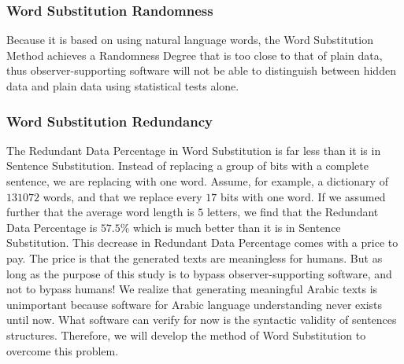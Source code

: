 \documentclass{acm_proc_article-sp}
\begin{document}
\subsubsection{Word Substitution Randomness}\label{Word-Substitution-Randomness}
Because it is based on using natural language words, the Word Substitution Method achieves a Randomness Degree that is too close to that of plain data, thus observer-supporting software will not be able to distinguish between hidden data and plain data using statistical tests alone.

\subsubsection{Word Substitution Redundancy}\label{Word-Substitution-Redundancy}
The Redundant Data Percentage in Word Substitution is far less than it is in Sentence Substitution. Instead of replacing a group of bits with a complete sentence, we are replacing with one word. Assume, for example, a dictionary of $131072$ words, and that we replace every $17$ bits with one word. If we assumed further that the average word length is $5$ letters, we find that the Redundant Data Percentage is $57.5\%$ which is much better than it is in Sentence Substitution. This decrease in Redundant Data Percentage comes with a price to pay. The price is that the generated texts are meaningless for humans. But as long as the purpose of this study is to bypass observer-supporting software, and not to bypass humans! We realize that generating meaningful Arabic texts is unimportant because software for Arabic language understanding never exists until now. What software can verify for now is the syntactic validity of sentences structures. Therefore, we will develop the method of Word Substitution to overcome this problem.
\end{document}
